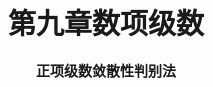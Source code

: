 


\title[数学分析]{\texorpdfstring{\LARGE \bfseries 第九章\quad 数项级数}{第九章 数项级数}} %
\author[正项级数敛散性判别法] %
{\Large \bfseries 正项级数敛散性判别法}
\date{}





\begin{frame}

\titlepage %

\end{frame}





